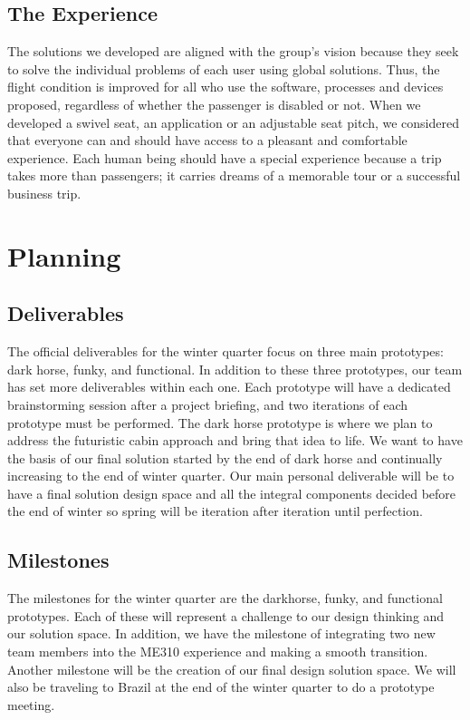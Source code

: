 \documentclass[a4paper, 12pt,conference]{new_cit_thesis}
\begin{document}
\section{The Experience}
The solutions we developed are aligned with the group's vision because they seek to solve the individual problems of each user using global solutions. Thus, the flight condition is improved for all who use the software, processes and devices proposed, regardless of whether the passenger is disabled or not. When we developed a swivel seat, an application or an adjustable seat pitch, we considered that everyone can and should have access to a pleasant and comfortable experience. Each human being should have a special experience because a trip takes more than passengers; it carries dreams of a memorable tour or a successful business trip.

\chapter{Planning}
\section{Deliverables}
The official deliverables for the winter quarter focus on three main prototypes: dark horse, funky, and functional.  In addition to these three prototypes, our team has set more deliverables within each one.  Each prototype will have a dedicated brainstorming session after a project briefing, and two iterations of each prototype must be performed. The dark horse prototype is where we plan to address the futuristic cabin approach and bring that idea to life.  We want to have the basis of our final solution started by the end of dark horse and continually increasing to the end of winter quarter.  Our main personal deliverable will be to have a final solution design space and all the integral components decided before the end of winter so spring will be iteration after iteration until perfection. 

\section{Milestones}
The milestones for the winter quarter are the darkhorse, funky, and functional prototypes.  Each of these will represent a challenge to our design thinking and our solution space.  In addition, we have the milestone of integrating two new team members into the ME310 experience and making a smooth transition.  Another milestone will be the creation of our final design solution space.  We will also be traveling to Brazil at the end of the winter quarter to do a prototype meeting. 
\end{document}
